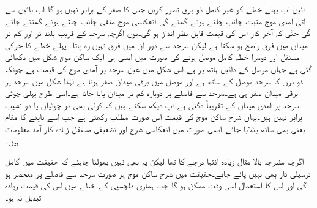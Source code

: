 آئیں اب پہلے خطے کو غیر کامل ذو برق تصور کریں جس کا  صفر کے برابر نہیں ہو گا۔اب بائیں سے آتی آمدی موج مثبت  جانب چلتے ہوئے گھٹے گی۔انعکاسی موج منفی  جانب چلتے ہوئے گھٹتے جائے گی حتٰی کہ آخر کار اس کی قیمت قابل نظر انداز ہو گی۔یوں اگرچہ سرحد کے قریب بلند تر اور کم تر میدان میں فرق  واضح ہو سکتا ہے لیکن سرحد سے دور ان میں فرق نہیں رہ پاتا۔ پہلے خطے کا حرکی مستقل  اور دوسرا خطہ کامل موصل ہونے کی صورت میں ایسی ہی ایک ساکن موج شکل  میں دکھائی گئی ہے جہاں موصل  کے دائیں ہاتھ پر ہے۔اس شکل میں عین سرحد پر آمدی
 موج کی قیمت  ہے۔چونکہ ذو برق کا سرحد موصل کے ساتھ ہے اور موصل میں برقی میدان صفر ہوتا ہے لہٰذا شکل میں سرحد پر برقی میدان صفر ہی ہے۔سرحد سے  فاصلے پر دوبارہ کم تر میدان پایا جاتا ہے۔اسی طرح  پہلی چوٹی سرحد پر آمدی میدان کے تقریباً  دگنی ہے۔آپ دیکھ سکتے ہیں کہ کوئی بھی دو چوٹیاں یا دو نشیب برابر نہیں ہیں۔یہاں شرح ساکن موج کی قیمت اس صورت مطلب رکھتی ہے جب اسے ناپنے کا مقام یعنی  بھی ساتھ بتلایا جائے۔ایسی صورت میں انعکاسی شرح اور تضعیفی مستقل زیادہ کار آمد معلومات ہیں۔

اگرچہ مندرجہ بالا مثال زیادہ انتہا درجے کا تھا لیکن یہ بھی نہیں بھولنا چاہئے کہ حقیقت میں کامل ترسیلی تار بھی نہیں پائے جاتے۔حقیقت میں شرح ساکن موج ہر صورت سرحد سے فاصلے پر منحصر ہو گی اور اس کا استعمال اسی وقت ممکن ہو گا جب ہماری دلچسپی کے خطے میں اس کی قیمت زیادہ تبدیل نہ ہو۔   

